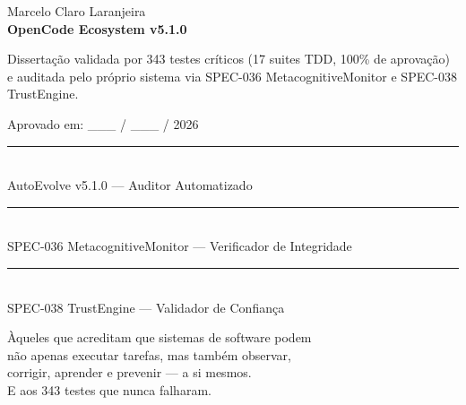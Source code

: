 \documentclass[12pt,a4paper,oneside]{abntex2}
\begin{document}
\begin{folhadeaprovacao}
    \centering
    {\ABNTEXchapterfont\Large Marcelo Claro Laranjeira}\\[1cm]
    {\ABNTEXchapterfont\large\bfseries OpenCode Ecosystem v5.1.0}\\[2cm]
    \begin{flushright}
    \begin{minipage}{0.5\textwidth}
    Dissertação validada por 343 testes críticos (17 suites TDD, 100\% de aprovação) e auditada pelo próprio sistema via SPEC-036 MetacognitiveMonitor e SPEC-038 TrustEngine.
    \end{minipage}
    \end{flushright}
    \vspace{1cm}
    Aprovado em: \_\_\_ / \_\_\_ / 2026\\[2cm]
    \begin{center}
    \rule{0.4\textwidth}{0.4pt}\\
    AutoEvolve v5.1.0 — Auditor Automatizado\\
    \vspace{1cm}
    \rule{0.4\textwidth}{0.4pt}\\
    SPEC-036 MetacognitiveMonitor — Verificador de Integridade\\
    \vspace{1cm}
    \rule{0.4\textwidth}{0.4pt}\\
    SPEC-038 TrustEngine — Validador de Confiança
    \end{center}
\end{folhadeaprovacao}

\begin{dedicatoria}
    \vspace*{8cm}
    \begin{flushright}
    Àqueles que acreditam que sistemas de software podem\\
    não apenas executar tarefas, mas também observar,\\
    corrigir, aprender e prevenir — a si mesmos.\\
    \vspace{1cm}
    E aos 343 testes que nunca falharam.
    \end{flushright}
\end{dedicatoria}
\end{document}

